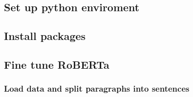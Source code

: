 \documentclass[
]{article}
\begin{document}
\subsection{Set up python enviroment}\label{set-up-python-enviroment}

\subsection{Install packages}\label{install-packages}

\subsection{Fine tune RoBERTa}\label{fine-tune-roberta}

\subsubsection{Load data and split paragraphs into
sentences}\label{load-data-and-split-paragraphs-into-sentences}
\end{document}
